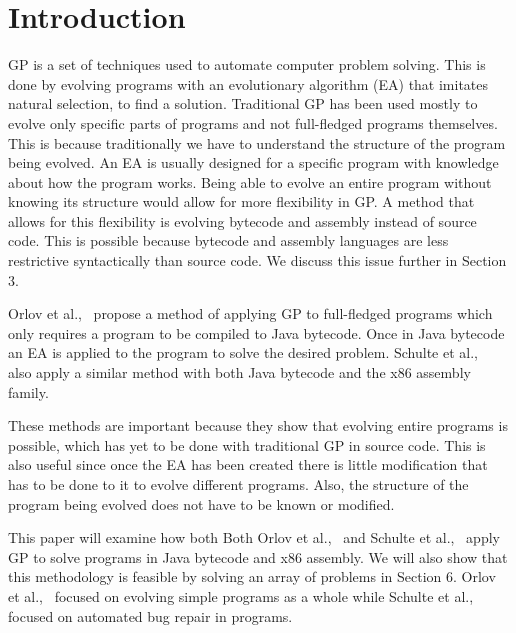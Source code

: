 \documentclass{sig-alternate}
\begin{document}

\section{Introduction}
GP is a set of techniques used to automate computer problem solving. This is done by evolving programs with an evolutionary algorithm (EA) that imitates natural selection, to find a solution. Traditional GP has been used mostly to evolve only specific parts of programs and not full-fledged programs themselves. This is because traditionally we have to understand the structure of the program being evolved. An EA is usually designed for a specific program with knowledge about how the program works. Being able to evolve an entire program without knowing its structure would allow for more flexibility in GP. A method that allows for this flexibility is evolving bytecode and assembly instead of source code. This is possible because bytecode and assembly languages are less restrictive syntactically than source code. We discuss this issue further in Section 3.\par 

Orlov et al.,~\cite{FINCH2:2009} propose a method of applying GP to full-fledged programs which only requires a program to be compiled to Java bytecode. Once in Java bytecode an EA is applied to the program to solve the desired problem. Schulte et al.,~\cite{Assembly:2010} also apply a similar method with both Java bytecode and the x86 assembly family.

These methods are important because they show that evolving entire programs is possible, which has yet to be done with traditional GP in source code. This is also useful since once the EA has been created there is little modification that has to be done to it to evolve different programs. Also, the structure of the program being evolved does not have to be known or modified.\par

	This paper will examine how both Both Orlov et al.,~\cite{FINCH:2011} and Schulte et al.,~\cite{Assembly:2010} apply GP to solve programs in Java bytecode and x86 assembly. We will also show that this methodology is feasible by solving an array of problems in Section 6. Orlov et al.,~\cite{FINCH:2011} focused on evolving simple programs as a whole while Schulte et al.,~\cite{Assembly:2010} focused on automated bug repair in programs.\par
	
\end{document}
